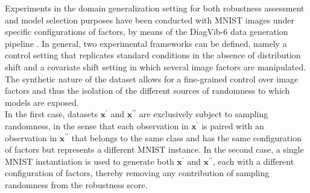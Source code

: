 Experiments in the domain generalization setting for both robustness
assessment and model selection purposes have been conducted with
MNIST images under specific configurations of factors, by means of the
DiagVib-6 data generation pipeline
\cite{euligDiagViB6DiagnosticBenchmark2021}.
In general, two experimental frameworks can be defined, namely a control setting
that replicates standard conditions in the absence of distribution shift and
a covariate shift setting in which several image factors are manipulated. The synthetic
nature of the dataset allows for a fine-grained control over image factors and 
thus the isolation of the different sources of randomness
to which models are exposed. \\

In the first case, datasets $\bm{x}^\prime$ and 
$\bm{x}^{\prime \prime}$ are exclusively subject to sampling randomness, 
in the sense that each observation in $\bm{x}^\prime$ is paired with an 
observation in $\bm{x}^{\prime \prime}$ that belongs to the same class and has the same
configuration of factors but represents a different MNIST instance. In 
the second case, a single MNIST instantiation is used to generate both 
$\bm{x}^\prime$ and $\bm{x}^{\prime \prime}$, each with a different configuration of factors, 
thereby removing any contribution of sampling randomness from the robustness score.



